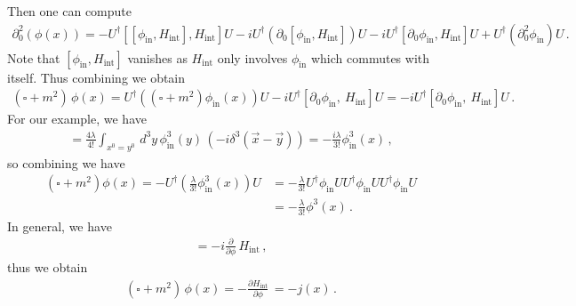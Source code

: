 \documentclass[11pt, onesided]{book}
\theoremstyle{break}
\theoremstyle{break}
\newcommand{\pd}{\partial}
\begin{document}
Then one can compute
\begin{align*}
\pd_0^2(\phi(x)) = -U^\dagger [[\phi_{\text{in}}, H_{\text{int}}], H_{\text{int}}]U 
-i U^\dagger\left(\pd_0 [\phi_{\text{in}}, H_{\text{int}}]\right)U 
-i U^\dagger[\pd_0 \phi_{\text{in}}, H_{\text{int}}] U 
+ U^\dagger (\pd_0^2\phi_{\text{in}}) U\,.
\end{align*}
Note that $[\phi_{\text{in}}, H_{\text{int}}]$ vanishes as $H_{\text{int}}$ only involves $\phi_{\text{in}}$ which commutes with itself. Thus combining we obtain
\begin{align*}
(\square + m^2)\,\phi(x) = U^\dagger\left( (\square +m^2) \phi_{\text{in}}(x) \right) U - iU^\dagger[\pd_0 \phi_{\text{in}},\ H_{\text{int}}]U =- iU^\dagger[\pd_0 \phi_{\text{in}},\ H_{\text{int}}]U \,.
\end{align*}
For our example, we have
\begin{align*}
[\pd_0 \phi_{\text{in}}, H_{\text{in}}] = \frac{4\lambda}{4!} \int_{x^0 = y^0} \, d^3y \, \phi_{\text{in}}^3(y)\, \left( -i \delta^3(\vec{x}- \vec{y})\right) = -\frac{i\lambda}{3!}\phi^3_{\text{in}}(x)\,,
\end{align*}
so combining we have
\begin{align*}
(\square +m^2) \phi(x) = -U^\dagger \left( \frac{\lambda }{3!}\phi_{\text{in}}^3(x)\right) U 
&= -\frac{\lambda}{3!}U^\dagger\phi_{\text{in}}UU^\dagger \phi_{\text{in}}UU^\dagger \phi_{\text{in}}U \\
&= -\frac{\lambda}{3!}\phi^3(x)\,.
\end{align*}
In general, we have
\begin{align*}
[\pd_0 \phi_{\text{in}}, \, H_{\text{int}}] = -i \frac{\pd}{\pd \phi}\, H_{\text{int}}\,,
\end{align*}
thus we obtain
\begin{align*}
(\square + m^2) \, \phi(x) = -\frac{\pd H_{\text{int}}}{\pd \phi}\, = -j(x)\,.
\end{align*}
\end{document}
